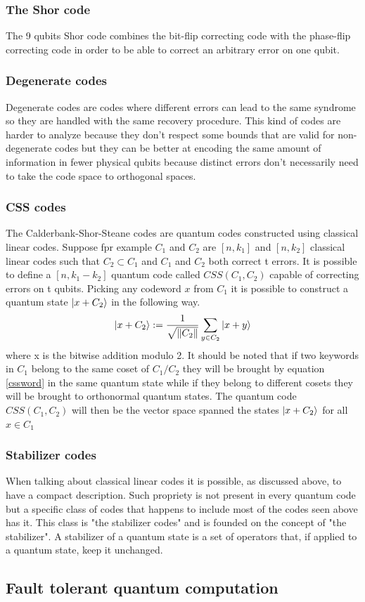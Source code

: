 \documentclass{article}
\begin{document}
\subsubsection{The Shor code}
The 9 qubits Shor code combines the bit-flip correcting code with the phase-flip
correcting code in order to be able to correct an arbitrary error on one qubit.

\subsubsection{Degenerate codes}

Degenerate codes are codes where different errors can lead to the same syndrome
so they are handled with the same recovery procedure.
This kind of codes are harder to analyze because they don't respect some bounds that are
valid for non-degenerate codes but they can be better at encoding the same amount of
information in fewer physical qubits because distinct errors don't necessarily need
to take the code space to orthogonal spaces.
\subsubsection{CSS codes}

The Calderbank-Shor-Steane codes are quantum codes constructed using classical linear codes.
Suppose fpr example $C_1$ and $C_2$ are $[n,k_1]$ and $[n,k_2]$ classical linear codes such that $C_2 \subset C_1$
and $C_1$ and $C_2$ both correct t errors.
It is possible to define a $[n, k_1 - k_2]$ quantum code called $CSS(C_1, C_2)$ capable of
correcting errors on t qubits.
Picking any codeword $x$ from $C_1$ it is possible to construct a quantum state $\ket{x + C_2}$
in the following way.
\begin{equation}
	\label{cssword}
	\ket{x + C_2} := \dfrac{1}{\sqrt{\|C_2\|}} \sum_{y \in C_2}\ket{x+y}
\end{equation}
where x is the bitwise addition modulo 2.
It should be noted that if two keywords in $C_1$ belong to the same coset of $C_1/C_2$
they will be brought by equation \ref{cssword} in the same quantum
state while if they belong to different cosets they will be brought
to orthonormal quantum states.
The quantum code $CSS(C_1, C_2)$ will then be the vector space spanned the states
$\ket{x+C_2}$ for all $x \in C_1$


\subsubsection{Stabilizer codes}
When talking about classical linear codes it is possible, as discussed above,
to have a compact description.
Such propriety is not present in every quantum code but a specific class of
codes that happens to include most of the codes seen above has it.
This class is "the stabilizer codes" and is founded on the concept of
"the stabilizer".
A stabilizer of a quantum state is a set of operators that, if applied to a
quantum state, keep it unchanged.




\subsection{Fault tolerant quantum computation}
\end{document}
